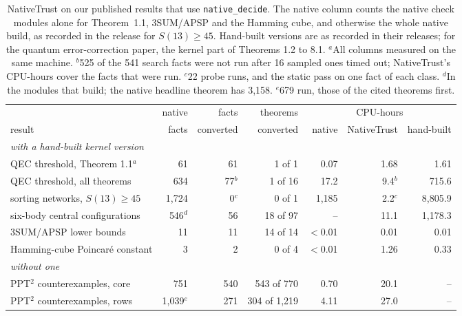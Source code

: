 \documentclass[11pt]{article}
\begin{document}
\begin{table}[!ht]\centering\small
\setlength{\tabcolsep}{3pt}
\begin{tabular}{lrrrrrr}\toprule
 & native & facts & theorems & \multicolumn{3}{c}{CPU-hours}\\
result & facts & converted & converted & native & NativeTrust & hand-built\\\midrule
\multicolumn{7}{l}{\emph{with a hand-built kernel version}}\\
QEC threshold, Theorem 1.1$^a$ & 61 & 61 & 1 of 1 & 0.07 & 1.68 & 1.61\\
QEC threshold, all theorems & 634 & 77$^b$ & 1 of 16 & 17.2 & 9.4$^b$ & 715.6\\
sorting networks, \(S(13)\ge 45\) & 1,724 & 0$^c$ & 0 of 1 & 1,185 & 2.2$^c$ & 8,805.9\\
six-body central configurations & 546$^d$ & 56 & 18 of 97 & -- & 11.1 & 1,178.3\\
3SUM/APSP lower bounds & 11 & 11 & 14 of 14 & $<$0.01 & 0.01 & 0.01\\
Hamming-cube Poincar\'e constant & 3 & 2 & 0 of 4 & $<$0.01 & 1.26 & 0.33\\\midrule
\multicolumn{7}{l}{\emph{without one}}\\
PPT\(^2\) counterexamples, core & 751 & 540 & 543 of 770 & 0.70 & 20.1 & --\\
PPT\(^2\) counterexamples, rows & 1,039$^e$ & 271 & 304 of 1,219 & 4.11 & 27.0 & --\\\bottomrule
\end{tabular}
\caption{NativeTrust on our published results that use \texttt{native\_decide}. The native column counts the
native check modules alone for Theorem~1.1, 3SUM/APSP and the Hamming cube, and otherwise the whole native
build, as recorded in the release for \(S(13)\ge 45\). Hand-built versions are as recorded in their
releases; for the quantum error-correction paper, the kernel part of Theorems 1.2 to 8.1. $^a$All columns
measured on the same machine. $^b$525 of the 541 search facts were not run after 16 sampled ones timed out;
NativeTrust's CPU-hours cover the facts that were run. $^c$22 probe runs, and the static pass on one fact
of each class. $^d$In the modules that build; the native headline theorem has 3,158. $^e$679 run, those of the
cited theorems first.}\label{tab:inhouse}
\end{table}
\end{document}
